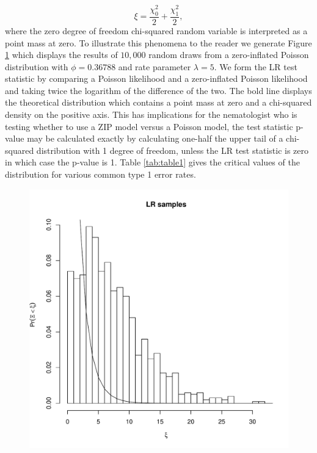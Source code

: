 \documentclass{article}
\begin{document}
\begin{equation}
\xi = \frac{\chi^2_0}{2} + \frac{\chi^2_1}{2},
\end{equation}
where the zero degree of freedom chi-squared random variable is interpreted as a point mass at zero. To illustrate this phenomena to the reader we generate Figure \ref{fig:twice_log_likelihood} which displays the results of $10,000$ random draws from a zero-inflated Poisson distribution with $\phi=0.36788$ and rate parameter $\lambda=5$. 
We form the LR test statistic by comparing a Poisson likelihood and a zero-inflated Poisson likelihood and taking twice the logarithm of the difference of the two. The bold line displays the  theoretical distribution which contains a point mass at zero and a chi-squared density on the positive axis. This has implications for the nematologist who is testing whether to use a ZIP model versus a Poisson model, the test statistic p-value may be calculated exactly by calculating one-half the upper tail of a chi-squared distribution with 1 degree of freedom, unless the LR test statistic is zero in which case the p-value is 1. Table \ref{tab:table1} gives the critical values of the distribution for various common type 1 error rates. 

\begin{figure}[H]
\label{fig:twice_log_likelihood}
\vspace{0.5in}
\begin{center}
\includegraphics[scale=0.6]{hist.pdf}
\end{center}
\end{figure}
\end{document}
